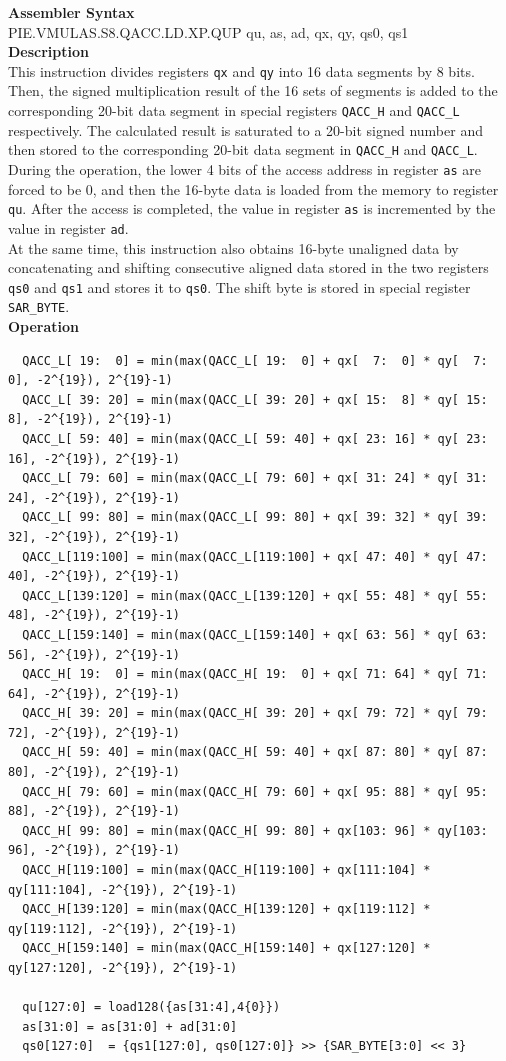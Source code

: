 \textbf{Assembler Syntax} \\
PIE.VMULAS.S8.QACC.LD.XP.QUP qu, as, ad, qx, qy, qs0, qs1 \\
\textbf{Description} \\
This instruction divides registers \lstinline{qx} and \lstinline{qy} into 16 data segments by 8 bits. Then, the signed multiplication result of the 16 sets of segments is added to the corresponding 20-bit data segment in special registers \lstinline{QACC_H} and \lstinline{QACC_L} respectively. The calculated result is saturated to a 20-bit signed number and then stored to the corresponding 20-bit data segment in \lstinline{QACC_H} and \lstinline{QACC_L}.\\
During the operation, the lower 4 bits of the access address in register \lstinline{as} are forced to be 0, and then the 16-byte data is loaded from the memory to register \lstinline{qu}. After the access is completed, the value in register \lstinline{as} is incremented by the value in register \lstinline{ad}.\\
At the same time, this instruction also obtains 16-byte unaligned data by concatenating and shifting consecutive aligned data stored in the two registers \lstinline{qs0} and \lstinline{qs1} and stores it to \lstinline{qs0}. The shift byte is stored in special register \lstinline{SAR_BYTE}.\\
\textbf{Operation}
\begin{lstlisting}
  QACC_L[ 19:  0] = min(max(QACC_L[ 19:  0] + qx[  7:  0] * qy[  7:  0], -2^{19}), 2^{19}-1)
  QACC_L[ 39: 20] = min(max(QACC_L[ 39: 20] + qx[ 15:  8] * qy[ 15:  8], -2^{19}), 2^{19}-1)
  QACC_L[ 59: 40] = min(max(QACC_L[ 59: 40] + qx[ 23: 16] * qy[ 23: 16], -2^{19}), 2^{19}-1)
  QACC_L[ 79: 60] = min(max(QACC_L[ 79: 60] + qx[ 31: 24] * qy[ 31: 24], -2^{19}), 2^{19}-1)
  QACC_L[ 99: 80] = min(max(QACC_L[ 99: 80] + qx[ 39: 32] * qy[ 39: 32], -2^{19}), 2^{19}-1)
  QACC_L[119:100] = min(max(QACC_L[119:100] + qx[ 47: 40] * qy[ 47: 40], -2^{19}), 2^{19}-1)
  QACC_L[139:120] = min(max(QACC_L[139:120] + qx[ 55: 48] * qy[ 55: 48], -2^{19}), 2^{19}-1)
  QACC_L[159:140] = min(max(QACC_L[159:140] + qx[ 63: 56] * qy[ 63: 56], -2^{19}), 2^{19}-1)
  QACC_H[ 19:  0] = min(max(QACC_H[ 19:  0] + qx[ 71: 64] * qy[ 71: 64], -2^{19}), 2^{19}-1)
  QACC_H[ 39: 20] = min(max(QACC_H[ 39: 20] + qx[ 79: 72] * qy[ 79: 72], -2^{19}), 2^{19}-1)
  QACC_H[ 59: 40] = min(max(QACC_H[ 59: 40] + qx[ 87: 80] * qy[ 87: 80], -2^{19}), 2^{19}-1)
  QACC_H[ 79: 60] = min(max(QACC_H[ 79: 60] + qx[ 95: 88] * qy[ 95: 88], -2^{19}), 2^{19}-1)
  QACC_H[ 99: 80] = min(max(QACC_H[ 99: 80] + qx[103: 96] * qy[103: 96], -2^{19}), 2^{19}-1)
  QACC_H[119:100] = min(max(QACC_H[119:100] + qx[111:104] * qy[111:104], -2^{19}), 2^{19}-1)
  QACC_H[139:120] = min(max(QACC_H[139:120] + qx[119:112] * qy[119:112], -2^{19}), 2^{19}-1)
  QACC_H[159:140] = min(max(QACC_H[159:140] + qx[127:120] * qy[127:120], -2^{19}), 2^{19}-1)

  qu[127:0] = load128({as[31:4],4{0}})
  as[31:0] = as[31:0] + ad[31:0]
  qs0[127:0]  = {qs1[127:0], qs0[127:0]} >> {SAR_BYTE[3:0] << 3}
\end{lstlisting}

